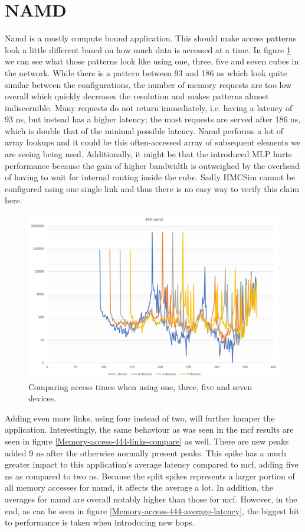 \section{NAMD}
Namd is a mostly compute bound application. This should make access patterns look a little different based on how much data is accessed at a time. In figure \ref{Memory-access-444} we can see what those patterns look like using one, three, five and seven cubes in the network. While there is a pattern between 93 and 186 ns which look quite similar between the configurations, the number of memory requests are too low overall which quickly decreases the resolution and makes patterns almost indiscernible. Many requests do not return immediately, i.e. having a latency of 93 ns, but instead has a higher latency; the most requests are served after 186 ns, which is double that of the minimal possible latency. Namd performs a lot of array lookups and it could be this often-accessed array of subsequent elements we are seeing being used. Additionally, it might be that the introduced MLP hurts performance because the gain of higher bandwidth is outweighed by the overhead of having to wait for internal routing inside the cube. Sadly HMCSim cannot be configured using one single link and thus there is no easy way to verify this claim here.
\bigskip

\begin{figure}[!ht]
    \centering
    \includegraphics[width=1\linewidth]{figure/444-x_4-1.jpg}
    \caption{Comparing access times when using one, three, five and seven devices.}
    \label{Memory-access-444}
\end{figure}

Adding even more links, using four instead of two, will further hamper the application. Interestingly, the same behaviour as was seen in the mcf results are seen in figure \ref{Memory-access-444-links-compare} as well. There are new peaks added 9 ns after the otherwise normally present peaks. This spike has a much greater impact to this application's average latency compared to mcf, adding five ns as compared to two ns. Because the split spikes represents a larger portion of all memory accesses for namd, it affects the average a lot. In addition, the averages for namd are overall notably higher than those for mcf. However, in the end, as can be seen in figure \ref{Memory-access-444-average-latency}, the biggest hit to performance is taken when introducing new hops.
\bigskip

